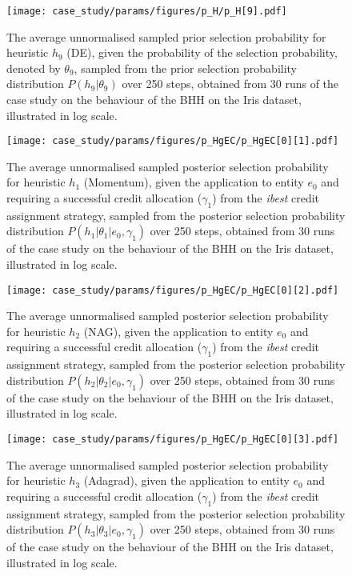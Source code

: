 \begin{figure}[htpb]
	\centering
	\texttt{[image: case\_study/params/figures/p\_H/p\_H[9].pdf]}
	\caption{The average unnormalised sampled prior selection probability for heuristic $h_{9}$ (\acs{DE}), given the probability of the selection probability, denoted by $\theta_{9}$, sampled from the prior selection probability distribution $P(h_{9} \vert \theta_{9})$ over 250 steps, obtained from 30 runs of the case study on the behaviour of the \acs{BHH} on the Iris dataset, illustrated in log scale.}
	\label{fig:app:case_study_additional:p_H:9}
\end{figure}



\begin{figure}[htpb]
	\centering
	\texttt{[image: case\_study/params/figures/p\_HgEC/p\_HgEC[0][1].pdf]}
	\caption{The average unnormalised sampled posterior selection probability for heuristic $h_{1}$ (\acs{Momentum}), given the application to entity $e_{0}$ and requiring a successful credit allocation ($\gamma_{1}$) from the \textit{ibest} credit assignment strategy, sampled from the posterior selection probability distribution $P(h_{1} \vert \theta_{1} \vert e_{0}, \gamma_{1})$ over 250 steps, obtained from 30 runs of the case study on the behaviour of the \acs{BHH} on the Iris dataset, illustrated in log scale.}
	\label{fig:app:case_study_additional:p_HgEC:0:1}
\end{figure}

\begin{figure}[htpb]
	\centering
	\texttt{[image: case\_study/params/figures/p\_HgEC/p\_HgEC[0][2].pdf]}
	\caption{The average unnormalised sampled posterior selection probability for heuristic $h_{2}$ (\acs{NAG}), given the application to entity $e_{0}$ and requiring a successful credit allocation ($\gamma_{1}$) from the \textit{ibest} credit assignment strategy, sampled from the posterior selection probability distribution $P(h_{2} \vert \theta_{2} \vert e_{0}, \gamma_{1})$ over 250 steps, obtained from 30 runs of the case study on the behaviour of the \acs{BHH} on the Iris dataset, illustrated in log scale.}
	\label{fig:app:case_study_additional:p_HgEC:0:2}
\end{figure}

\begin{figure}[htpb]
	\centering
	\texttt{[image: case\_study/params/figures/p\_HgEC/p\_HgEC[0][3].pdf]}
	\caption{The average unnormalised sampled posterior selection probability for heuristic $h_{3}$ (\acs{Adagrad}), given the application to entity $e_{0}$ and requiring a successful credit allocation ($\gamma_{1}$) from the \textit{ibest} credit assignment strategy, sampled from the posterior selection probability distribution $P(h_{3} \vert \theta_{3} \vert e_{0}, \gamma_{1})$ over 250 steps, obtained from 30 runs of the case study on the behaviour of the \acs{BHH} on the Iris dataset, illustrated in log scale.}
	\label{fig:app:case_study_additional:p_HgEC:0:3}
\end{figure}

